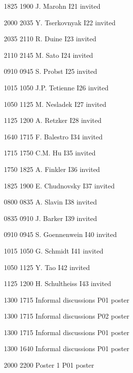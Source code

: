          {1825} {1900} {J. Marohn} {} {I21} {invited}
        
         {2000} {2035} {Y. Tserkovnyak} {} {I22} {invited}
        
         {2035} {2110} {R. Duine} {} {I23} {invited}
        
         {2110} {2145} {M. Sato} {} {I24} {invited}
        
         {0910} {0945} {S. Probst} {} {I25} {invited}
        
         {1015} {1050} {J.P. Tetienne} {} {I26} {invited}
        
         {1050} {1125} {M. Nesladek} {} {I27} {invited}
        
         {1125} {1200} {A. Retzker} {} {I28} {invited}
        
         {1640} {1715} {F. Balestro} {} {I34} {invited}
        
         {1715} {1750} {C.M. Hu} {} {I35} {invited}
        
         {1750} {1825} {A. Finkler} {} {I36} {invited}
        
         {1825} {1900} {E. Chudnovsky} {} {I37} {invited}
        
         {0800} {0835} {A. Slavin} {} {I38} {invited}
        
         {0835} {0910} {J. Barker} {} {I39} {invited}
        
         {0910} {0945} {S. Goennenwein} {} {I40} {invited}
        
         {1015} {1050} {G. Schmidt} {} {I41} {invited}
        
         {1050} {1125} {Y. Tao} {} {I42} {invited}
        
         {1125} {1200} {H. Schultheiss} {} {I43} {invited}
        
         {1300} {1715} {Informal discussions} {} {P01} {poster}
        
         {1300} {1715} {Informal discussions} {} {P02} {poster}
        
         {1300} {1715} {Informal discussions} {} {P01} {poster}
        
         {1300} {1640} {Informal discussions} {} {P01} {poster}
        
         {2000} {2200} {Poster 1} {} {P01} {poster}
        
